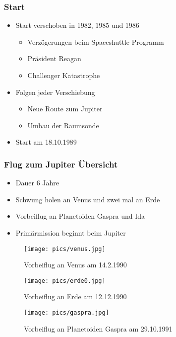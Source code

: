 \begin{frame}
\frametitle{Start}
	\begin{itemize}
		\item Start verschoben in 1982, 1985 und 1986
		\begin{itemize}
			\item Verz\"ogerungen beim Spaceshuttle Programm
			\item Pr\"asident Reagan
			\item Challenger Katastrophe
		\end{itemize}
		\item Folgen jeder Verschiebung
		\begin{itemize}
			\item Neue Route zum Jupiter
			\item Umbau der Raumsonde
		\end{itemize}
		\item Start am 18.10.1989
	\end{itemize}
\end{frame}

\begin{frame}
\frametitle{Flug zum Jupiter \"Ubersicht}
	\begin{itemize}
		\item Dauer 6 Jahre
		\item Schwung holen an Venus und zwei mal an Erde
		\item Vorbeiflug an Planetoiden Gaspra und Ida
		\item Primärmission beginnt beim Jupiter
	\end{itemize}
\end{frame}


\begin{frame}
	\begin{figure}
		\centering
		\texttt{[image: pics/venus.jpg]}
		\caption{Vorbeiflug an Venus am 14.2.1990\cite{nasaphoto}}
		\label{VENUS}
	\end{figure}
\end{frame}

\begin{frame}
	\begin{figure}
		\centering
		\texttt{[image: pics/erde0.jpg]}
		\caption{Vorbeiflug an Erde am 12.12.1990\cite{nasaphoto}}
		\label{ERDE0}
	\end{figure}
\end{frame}

\begin{frame}
	\begin{figure}
		\centering
		\texttt{[image: pics/gaspra.jpg]}
		\caption{Vorbeiflug an Planetoiden Gaspra am 29.10.1991\cite{nasaphoto}}
		\label{GASPRA}
	\end{figure}
\end{frame}

